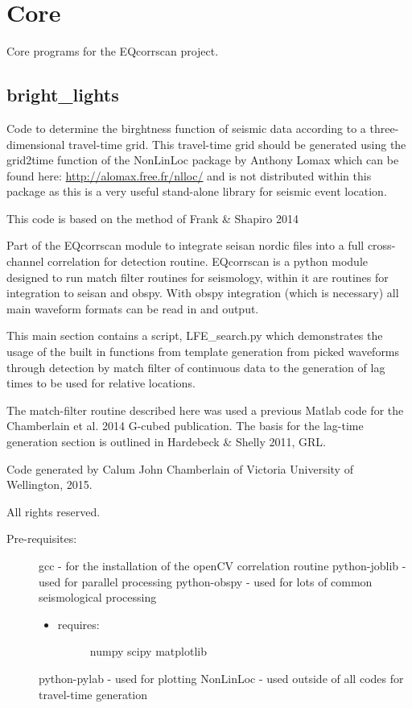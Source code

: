 \documentclass[a4paper,10pt,english]{sphinxmanual}
\begin{document}
\chapter{Core}
\label{modules:core}
Core programs for the EQcorrscan project.


\section{bright\_lights}
\label{modules:bright-lights}\label{modules:module-bright_lights}
Code to determine the birghtness function of seismic data according to a three-
dimensional travel-time grid.  This travel-time grid should be generated using
the grid2time function of the NonLinLoc package by Anthony Lomax which can be
found here: \href{http://alomax.free.fr/nlloc/}{http://alomax.free.fr/nlloc/} and is not distributed within this
package as this is a very useful stand-alone library for seismic event location.

This code is based on the method of Frank \& Shapiro 2014

Part of the EQcorrscan module to integrate seisan nordic files into a full
cross-channel correlation for detection routine.
EQcorrscan is a python module designed to run match filter routines for
seismology, within it are routines for integration to seisan and obspy.
With obspy integration (which is necessary) all main waveform formats can be
read in and output.

This main section contains a script, LFE\_search.py which demonstrates the usage
of the built in functions from template generation from picked waveforms
through detection by match filter of continuous data to the generation of lag
times to be used for relative locations.

The match-filter routine described here was used a previous Matlab code for the
Chamberlain et al. 2014 G-cubed publication.  The basis for the lag-time
generation section is outlined in Hardebeck \& Shelly 2011, GRL.

Code generated by Calum John Chamberlain of Victoria University of Wellington,
2015.

All rights reserved.
\begin{description}
\item[{Pre-requisites:}] \leavevmode
gcc             - for the installation of the openCV correlation routine
python-joblib   - used for parallel processing
python-obspy    - used for lots of common seismological processing
\begin{itemize}
\item {} \begin{description}
\item[{requires:}] \leavevmode
numpy
scipy
matplotlib

\end{description}

\end{itemize}

python-pylab    - used for plotting
NonLinLoc       - used outside of all codes for travel-time generation

\end{description}
\end{document}
